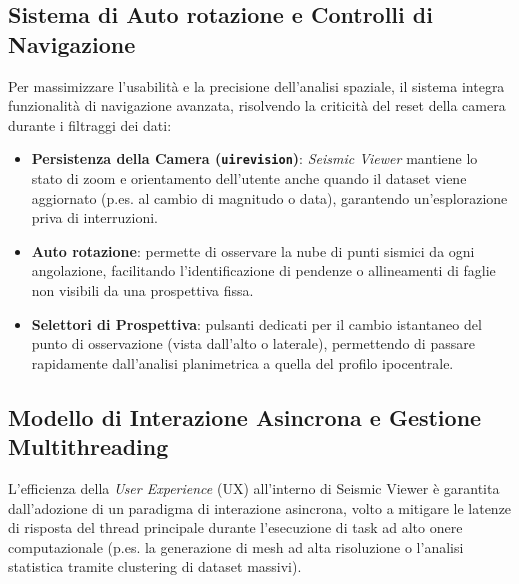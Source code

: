 \documentclass[12pt,a4paper]{article}
\begin{document}
\subsection{Sistema di Auto rotazione e Controlli di Navigazione}
Per massimizzare l'usabilità e la precisione dell'analisi spaziale, il sistema integra funzionalità di navigazione avanzata, risolvendo la criticità del reset della camera durante i filtraggi dei dati:
\begin{itemize}
    \item \textbf{Persistenza della Camera (\texttt{uirevision})}: \textit{Seismic Viewer} mantiene lo stato di zoom e orientamento dell'utente anche quando il dataset viene aggiornato (p.es. al cambio di magnitudo o data), garantendo un'esplorazione priva di interruzioni.
    \item \textbf{Auto rotazione}: permette di osservare la nube di punti sismici da ogni angolazione, facilitando l'identificazione di pendenze o allineamenti di faglie non visibili da una prospettiva fissa.
    \item \textbf{Selettori di Prospettiva}: pulsanti dedicati per il cambio istantaneo del punto di osservazione (vista dall'alto o laterale), permettendo di passare rapidamente dall'analisi planimetrica a quella del profilo ipocentrale.
\end{itemize}

\subsection{Modello di Interazione Asincrona e Gestione Multithreading}
L'efficienza della \textit{User Experience} (UX) all'interno di Seismic Viewer è garantita dall'adozione di un paradigma di interazione asincrona, volto a mitigare le latenze di risposta del thread principale durante l'esecuzione di task ad alto onere computazionale (p.es. la generazione di mesh ad alta risoluzione o l'analisi statistica tramite clustering di dataset massivi).
\end{document}
